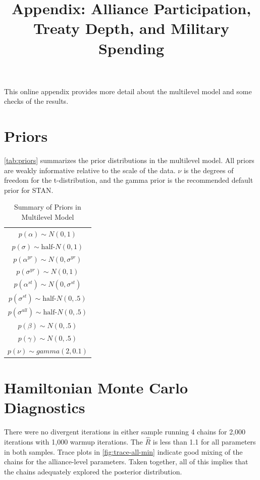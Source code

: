 \documentclass[12pt]{article}
\title{\textbf{Appendix: Alliance Participation, Treaty Depth, and Military Spending}}
\date{}
\begin{document}
\maketitle 

\doublespace 

This online appendix provides more detail about the multilevel model and some checks of the results. 


\section*{Priors}

\autoref{tab:priors} summarizes the prior distributions in the multilevel model. 
All priors are weakly informative relative to the scale of the data. 
$\nu$ is the degrees of freedom for the t-distribution, and the gamma prior is the recommended default prior for STAN. 

\begin{table} %
\begin{center}
\begin{tabular}{c} 
$ p(\alpha) \sim N(0, 1)$  \\
$ p(\sigma) \sim \mbox{half-}N(0, 1) $ \\
$ p(\alpha^{yr}) \sim N(0, \sigma^{yr}) $ \\ 
$ p(\sigma^{yr}) \sim N(0, 1) $ \\
$ p(\alpha^{st}) \sim N(0, \sigma^{st}) $ \\ 
$ p(\sigma^{st}) \sim \mbox{half-}N(0, .5) $ \\ 
$ p(\sigma^{all}) \sim \mbox{half-}N(0, .5) $ \\
$ p(\beta) \sim N(0, .5) $ \\
$ p(\gamma) \sim N(0, .5) $ \\ 
$ p(\nu) \sim gamma(2, 0.1)$ 
\end{tabular} 
\caption{Summary of Priors in Multilevel Model} 
\label{tab:priors}
\end{center} 
\end{table} 


\section*{Hamiltonian Monte Carlo Diagnostics}

There were no divergent iterations in either sample running 4 chains for 2,000 iterations with 1,000 warmup iterations. 
The $\hat{R}$ is less than 1.1 for all parameters in both samples. 
Trace plots in \autoref{fig:trace-all-min} indicate good mixing of the chains for the alliance-level parameters. 
Taken together, all of this implies that the chains adequately explored the posterior distribution. 
\end{document}

